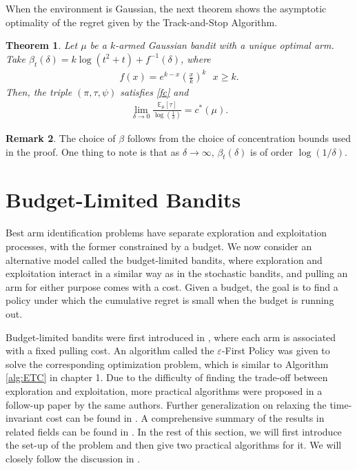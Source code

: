 \documentclass[letterpaper,11pt,openright,openany]{book}
\numberwithin{equation}{section}
\theoremstyle{plain}
\newtheorem{Th}{Theorem}[section]
\theoremstyle{definition}
\newtheorem{Rem}[Th]{Remark}
\def\E{{\mathbb E}}
\def\e{{\varepsilon}}
\begin{document}
When the environment is Gaussian, the next theorem shows the asymptotic optimality of the regret given by the Track-and-Stop Algorithm. 

\begin{Th}
Let $\mu$ be a $k$-armed Gaussian bandit with a unique optimal arm. Take $\beta_t(\delta)=k\log (t^2+t)+f^{-1}(\delta)$, where
\begin{align*}
f(x)=e^{k-x}\left(\frac{x}{k}\right)^k\ \ \ x\geq k. 
\end{align*}
Then, the triple $(\pi, \tau, \psi)$ satisfies \eqref{fc} and 
\begin{align*}
\displaystyle\lim_{\delta\to 0}\frac{\E_\mu[\tau]}{\log\left(\frac{1}{\delta}\right)}=c^*(\mu). 
\end{align*}
\end{Th}
\begin{Rem}
The choice of $\beta$ follows from the choice of concentration bounds used in the proof. One thing to note is that as $\delta\to\infty$, $\beta_t(\delta)$ is of order $\log(1/\delta)$. 
\end{Rem}

\section{Budget-Limited Bandits}

Best arm identification problems have separate exploration and exploitation processes, with the former constrained by a budget.  We now consider an alternative model called the budget-limited bandits, where exploration and exploitation interact in a similar way as in the stochastic bandits, and pulling an arm for either purpose comes with a cost. Given a budget, the goal is to find a policy under which the cumulative regret is small when the budget is running out. 

Budget-limited bandits were first introduced in \cite{tran2010epsilon}, where each arm is associated with a fixed pulling cost. An algorithm called the $\e$-First Policy was given to solve the corresponding optimization problem, which is similar to Algorithm \ref{alg:ETC} in chapter 1. 
Due to the difficulty of finding the trade-off between exploration and exploitation, more practical algorithms were proposed in a follow-up paper \cite{tran2012knapsack} by the same authors. Further generalization on relaxing the time-invariant cost can be found in \cite{ding2013multi}. A comprehensive summary of the results in related fields can be found in \cite{zhou2018budget}. In the rest of this section, we will first introduce the set-up of the problem and then give two practical algorithms for it. We will closely follow the discussion in \cite{tran2012knapsack}. 
\end{document}
